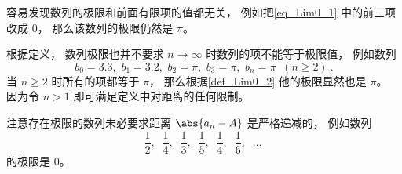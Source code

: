 \begin{example}{}
容易发现数列的极限和前面有限项的值都无关， 例如把\autoref{eq_Lim0_1} 中的前三项改成 $0$， 那么该数列的极限仍然是 $\pi$。
\end{example}

\begin{example}{}
根据定义， 数列极限也并不要求 $n\to \infty$ 时数列的项不能等于极限值， 例如数列
\begin{equation}
b_0 = 3.3,\,\, b_1 = 3.2, \,\, b_2 = \pi, \,\, b_3 = \pi, \,\, b_n = \pi \;\; (n \ge 2)~.
\end{equation}
当 $n \ge 2$ 时所有的项都等于 $\pi$， 那么根据\autoref{def_Lim0_2} 他的极限显然也是 $\pi$。 因为令 $n > 1$ 即可满足定义中对距离的任何限制。
\end{example}

\begin{example}{}
注意存在极限的数列未必要求距离 $\abs{a_n - A}$ 是严格递减的， 例如数列
\begin{equation}
\frac{1}{2},\;\; \frac{1}{4},\;\; \frac{1}{3},\;\; \frac{1}{5},\;\; \frac{1}{4},\;\; \frac{1}{6},\;\; \dots~
\end{equation}
的极限是 $0$。
\end{example}
